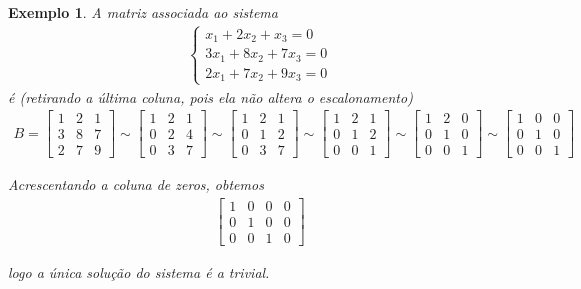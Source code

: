 \documentclass{article}
\newtheorem*{example}{Exemplo}
\begin{document}
\begin{example}
	A matriz associada ao sistema
	\begin{align*}
	\begin{cases}
		x_1 + 2x_2 + x_3 = 0 \\
		3x_1 + 8x_2 + 7x_3 = 0 \\
		2x_1 + 7x_2 + 9x_3 = 0		
	\end{cases}
	\end{align*}
	é (retirando a última coluna, pois ela não altera o escalonamento)
	\begin{align*}
	B = \begin{bmatrix}
	1 & 2 & 1 \\
	3 & 8 & 7 \\
	2 & 7 & 9
	\end{bmatrix}
	\sim
	\begin{bmatrix}
	1 & 2 & 1 \\
	0 & 2 & 4 \\
	0 & 3 & 7
	\end{bmatrix}
	\sim
	\begin{bmatrix}
	1 & 2 & 1 \\
	0 & 1 & 2 \\
	0 & 3 & 7
	\end{bmatrix}
	\sim
	\begin{bmatrix}
	1 & 2 & 1 \\
	0 & 1 & 2 \\
	0 & 0 & 1
	\end{bmatrix}
	\sim
	\begin{bmatrix}
	1 & 2 & 0 \\
	0 & 1 & 0 \\
	0 & 0 & 1
	\end{bmatrix}
	\sim
	\begin{bmatrix}
	1 & 0 & 0 \\
	0 & 1 & 0 \\
	0 & 0 & 1
	\end{bmatrix}
	\end{align*}
	\par\vspace{0.3cm} Acrescentando a coluna de zeros, obtemos
	\begin{align*}
	\begin{bmatrix}
	1 & 0 & 0 & 0 \\
	0 & 1 & 0 & 0 \\
	0 & 0 & 1 & 0 
	\end{bmatrix}
	\end{align*}
	\par\vspace{0.3cm} logo a única solução do sistema é a trivial.
\end{example}
\end{document}
